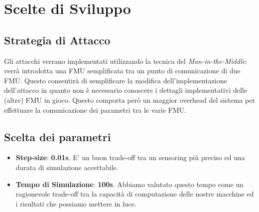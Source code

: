 \section{Scelte di Sviluppo}
\subsection{Strategia di Attacco}
Gli attacchi verrano implementati utilizzando la tecnica del \textit{Man-in-the-Middle}: verrà introdotta una FMU semplificata tra un punto di comunicazione di due FMU. Questo consentirà di semplificare la modifica dell'implementazione dell'attacco in quanto non è necessario conoscere i dettagli implementativi delle (altre) FMU in gioco. Questo comporta però un maggior overhead del sistema per effettuare la comunicazione dei parametri tra le varie FMU.
\subsection{Scelta dei parametri}

\begin{itemize}
	\item \textbf{Step-size}: \textbf{0.01s}. E' un buon trade-off tra un sensoring più preciso ed una durata di simulazione accettabile.
	\item \textbf{Tempo di Simulazione}: \textbf{100s}. Abbiamo valutato questo tempo come un ragionevole trade-off tra la capacità di computazione delle nostre macchine ed i risultati che possiamo mettere in luce. 
\end{itemize}